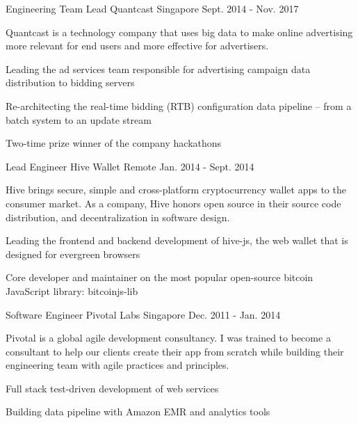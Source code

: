 \begin{cventries}
  \cventry
    {Engineering Team Lead} %
    {Quantcast} %
    {Singapore} %
    {Sept. 2014 - Nov. 2017} %
    {
      Quantcast is a technology company that uses big data to make online advertising more relevant for end users and more effective for advertisers.
      \begin{cvitems} %
        \item Leading the ad services team responsible for advertising campaign data distribution to bidding servers
        \item Re-architecting the real-time bidding (RTB) configuration data pipeline – from a batch system to an update stream
        \item Two-time prize winner of the company hackathons
      \end{cvitems}
    }

  \cventry
    {Lead Engineer} %
    {Hive Wallet} %
    {Remote} %
    {Jan. 2014 - Sept. 2014} %
    {
      Hive brings secure, simple and cross-platform cryptocurrency wallet apps to the consumer market. As a company, Hive honors open source in their source code distribution, and decentralization in software design.
      \begin{cvitems} %
        \item Leading the frontend and backend development of hive-js, the web wallet that is designed for evergreen browsers
        \item Core developer and maintainer on the most popular open-source bitcoin JavaScript library: bitcoinjs-lib
      \end{cvitems}
    }

  \cventry
    {Software Engineer} %
    {Pivotal Labs} %
    {Singapore} %
    {Dec. 2011 - Jan. 2014} %
    {
      Pivotal is a global agile development consultancy. I was trained to become a consultant to help our clients create their app from scratch while building their engineering team with agile practices and principles.
      \begin{cvitems} %
        \item Full stack test-driven development of web services
        \item Building data pipeline with Amazon EMR and analytics tools
      \end{cvitems}
    }
\end{cventries}
